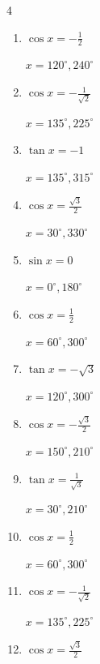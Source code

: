 \begin{multicols}{4}
\begin{enumerate}
  \item $\displaystyle \cos{x}  = -\frac{1}{2}$

        $\displaystyle x = 120^{\circ} , 240^{\circ}$

  \item $\displaystyle \cos{x}  = -\frac{1}{\sqrt{2}}$

        $\displaystyle x = 135^{\circ} , 225^{\circ}$

  \item $\displaystyle \tan{x}  = -1$

        $\displaystyle x = 135^{\circ} , 315^{\circ}$

  \item $\displaystyle \cos{x}  = \frac{\sqrt{3}}{2}$

        $\displaystyle x = 30^{\circ} , 330^{\circ}$

  \item $\displaystyle \sin{x}  = 0$

        $\displaystyle x = 0^{\circ} , 180^{\circ}$

  \item $\displaystyle \cos{x}  = \frac{1}{2}$

        $\displaystyle x = 60^{\circ} , 300^{\circ}$

  \item $\displaystyle \tan{x}  = -\sqrt{3}$

        $\displaystyle x = 120^{\circ} , 300^{\circ}$

  \item $\displaystyle \cos{x}  = -\frac{\sqrt{3}}{2}$

        $\displaystyle x = 150^{\circ} , 210^{\circ}$

  \item $\displaystyle \tan{x}  = \frac{1}{\sqrt{3}}$

        $\displaystyle x = 30^{\circ} , 210^{\circ}$

  \item $\displaystyle \cos{x}  = \frac{1}{2}$

        $\displaystyle x = 60^{\circ} , 300^{\circ}$

  \item $\displaystyle \cos{x}  = -\frac{1}{\sqrt{2}}$

        $\displaystyle x = 135^{\circ} , 225^{\circ}$

  \item $\displaystyle \cos{x}  = \frac{\sqrt{3}}{2}$


\end{enumerate}
\end{multicols}
